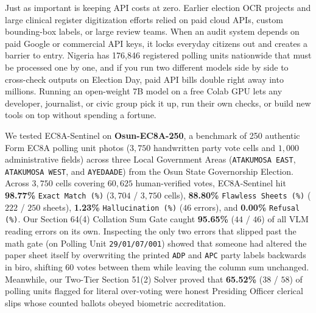\documentclass{article}
\begin{document}
Just as important is keeping API costs at zero. Earlier election OCR projects \cite{kimani2022using,uwakwe2026ai,young2026irevsentinel} and large clinical register digitization efforts \cite{tweya2026digitising} relied on paid cloud APIs, custom bounding-box labels, or large review teams. When an audit system depends on paid Google or commercial API keys, it locks everyday citizens out and creates a barrier to entry. Nigeria has 176,846 registered polling units nationwide that must be processed one by one, and if you run two different models side by side to cross-check outputs on Election Day, paid API bills double right away into millions. Running an open-weight 7B model on a free Colab GPU lets any developer, journalist, or civic group pick it up, run their own checks, or build new tools on top without spending a fortune.

We tested EC8A-Sentinel on \textbf{Osun-EC8A-250}, a benchmark of 250 authentic Form EC8A polling unit photos ($3,750$ handwritten party vote cells and $1,000$ administrative fields) across three Local Government Areas (\texttt{ATAKUMOSA EAST}, \texttt{ATAKUMOSA WEST}, and \texttt{AYEDAADE}) from the Osun State Governorship Election. Across $3,750$ cells covering $60,625$ human-verified votes, EC8A-Sentinel hit \textbf{98.77\%} \texttt{Exact Match (\%)} ($3,704$ / $3,750$ cells), \textbf{88.80\%} \texttt{Flawless Sheets (\%)} ($222$ / $250$ sheets), \textbf{1.23\%} \texttt{Hallucination (\%)} ($46$ errors), and \textbf{0.00\%} \texttt{Refusal (\%)}. Our Section 64(4) Collation Sum Gate caught \textbf{95.65\%} ($44$ / $46$) of all VLM reading errors on its own. Inspecting the only two errors that slipped past the math gate (on Polling Unit \texttt{29/01/07/001}) showed that someone had altered the paper sheet itself by overwriting the printed \texttt{ADP} and \texttt{APC} party labels backwards in biro, shifting $60$ votes between them while leaving the column sum unchanged. Meanwhile, our Two-Tier Section 51(2) Solver proved that \textbf{65.52\%} ($38$ / $58$) of polling units flagged for literal over-voting were honest Presiding Officer clerical slips whose counted ballots obeyed biometric accreditation.
\end{document}
